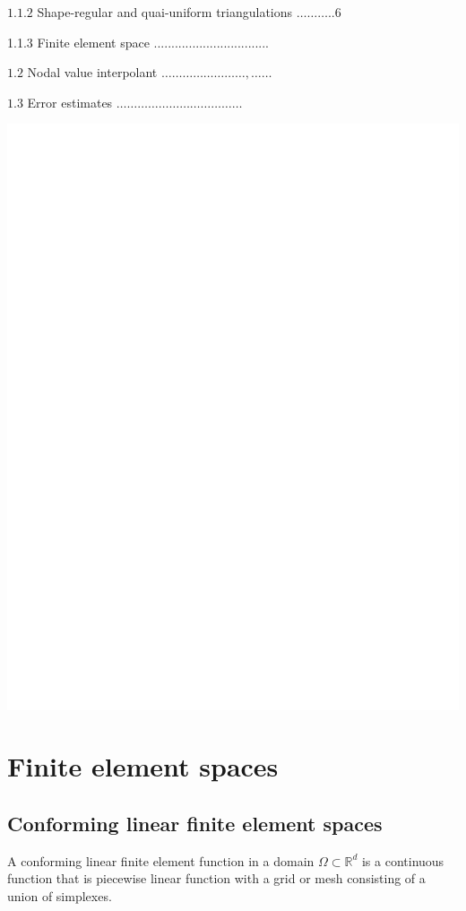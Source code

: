 \documentclass[10pt]{article}
\begin{document}
$1.1 .2$ Shape-regular and quai-uniform triangulations $\ldots \ldots \ldots . .6$

1.1.3 Finite element space .................................

$1.2$ Nodal value interpolant $\ldots \ldots \ldots \ldots \ldots \ldots \ldots \ldots, \ldots \ldots$

$1.3$ Error estimates $\ldots \ldots \ldots \ldots \ldots \ldots \ldots \ldots \ldots \ldots \ldots \ldots$

\includegraphics[max width=\textwidth]{2022_01_05_15c63bf4a948497c30d9g-04}

\section{Finite element spaces}
\subsection{Conforming linear finite element spaces}
A conforming linear finite element function in a domain $\Omega \subset \mathbb{R}^{d}$ is a continuous function that is piecewise linear function with a grid or mesh consisting of a union of simplexes.
\end{document}
